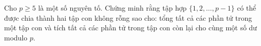\ifshowproblem
\begin{problem}\label{example:RUS-2015-TST-D10-P2}
    Cho \( p \geqslant 5 \) là một số nguyên tố.  
    Chứng minh rằng tập hợp \( \{1, 2, \ldots, p - 1\} \) có thể được chia thành hai tập con không rỗng sao cho:  
    tổng tất cả các phần tử trong một tập con và tích tất cả các phần tử trong tập con còn lại cho cùng một số dư modulo \( p \).
\end{problem}
\fi

\footnotemark
{}
\fi